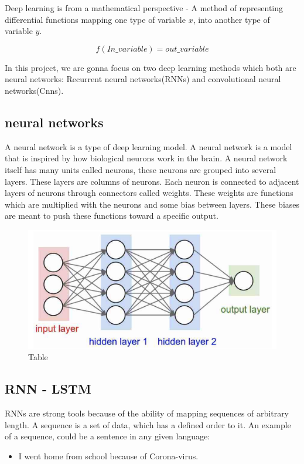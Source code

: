 Deep learning is from a mathematical perspective - A method of representing differential functions mapping one type of variable $x$, into another type of variable $y$.

$$
f(In\_variable) = out\_variable
$$

\noindent
In this project, we are gonna focus on two deep learning methods which both are neural networks: Recurrent neural networks(RNNs) and convolutional neural networks(Cnns).

\subsection{neural networks}
A neural network is a type of deep learning model. A neural network is a model that is inspired by how biological neurons work in the brain. A neural network itself has many units called neurons, these neurons are grouped into several layers. These layers are columns of neurons. Each neuron is connected to adjacent layers of neurons through connectors called weights. These weights are functions which are multiplied with the neurons and some bias between layers. These biases are meant to push these functions toward a specific output.

\begin{figure}[!ht]
  \centering
  \includegraphics[scale=0.4]{latex/imgs/NN.png}
  \caption{Table}\label{Baseline:before}
\end{figure}

\subsection{RNN - LSTM}
RNNs are strong tools because of the ability of mapping sequences of arbitrary length. A sequence is a set of data, which has a defined order to it. An example of a sequence, could be a sentence in any given language:
\begin{itemize}
    \item I went home from school because of Corona-virus.
\end{itemize}

